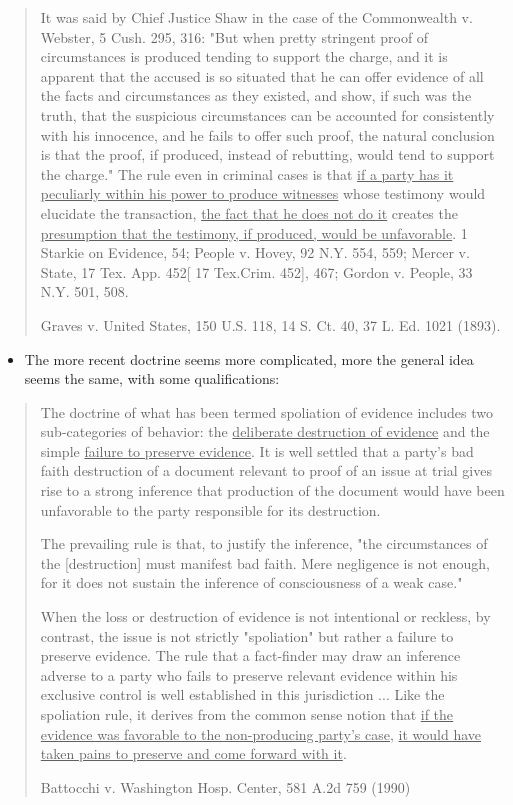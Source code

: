 \documentclass[
  10pt,
  dvipsnames,enabledeprecatedfontcommands]{scrartcl}
\providecommand{\tightlist}{%
  \setlength{\itemsep}{0pt}\setlength{\parskip}{0pt}}
\begin{document}
\begin{quote}
It was said by Chief Justice Shaw in the case of the Commonwealth v. Webster, 5 Cush. 295, 316: "But when pretty stringent proof of circumstances is produced tending to support the charge, and it is apparent that the accused is so situated that he can offer evidence of all the facts and circumstances as they existed, and show, if such was the truth, that the suspicious circumstances  can be accounted for consistently with his innocence, and he fails to offer such proof, the natural conclusion is that the proof, if produced, instead of rebutting, would tend to support the charge." The rule even in criminal cases is that \underline{if a party has it peculiarly within his power to produce witnesses} whose testimony would elucidate the transaction, \underline{the fact that he does not do it} creates the \underline{presumption that the testimony, if produced, would be unfavorable}. 1 Starkie on Evidence, 54; People v. Hovey, 92 N.Y. 554, 559; Mercer v. State, 17 Tex. App. 452[ 17 Tex.Crim. 452], 467; Gordon v. People, 33 N.Y. 501, 508.

Graves v. United States, 150 U.S. 118, 14 S. Ct. 40, 37 L. Ed. 1021 (1893).
\end{quote}


\begin{itemize}
\tightlist
\item
  The more recent doctrine seems more complicated, more the general idea
  seems the same, with some qualifications:
\end{itemize}

\begin{quote}
The doctrine of what has been termed spoliation of evidence includes two sub-categories of behavior: the \underline{deliberate destruction of evidence} and the simple \underline{failure to preserve evidence}. It is well settled that a party's bad faith destruction of a document relevant to proof of an issue at trial gives rise to a strong inference that production of the document would have been unfavorable to the party responsible for its destruction. 

The prevailing rule is that, to justify the inference, "the circumstances of the [destruction] must manifest bad faith. Mere negligence is not enough, for it does not sustain the inference of consciousness of a weak case." 

When the loss or destruction of evidence is not intentional or reckless, by contrast, the issue is not strictly "spoliation" but rather a failure to preserve evidence. The rule that a fact-finder may draw an inference adverse to a party who fails to preserve relevant evidence within his exclusive control is well established in this jurisdiction ... Like the spoliation rule, it derives from the common sense notion that \underline{if the evidence was favorable to the non-producing party's case}, \underline{it would have taken pains to preserve and come forward with it}.

Battocchi v. Washington Hosp. Center, 581 A.2d 759 (1990)
\end{quote}
\end{document}
